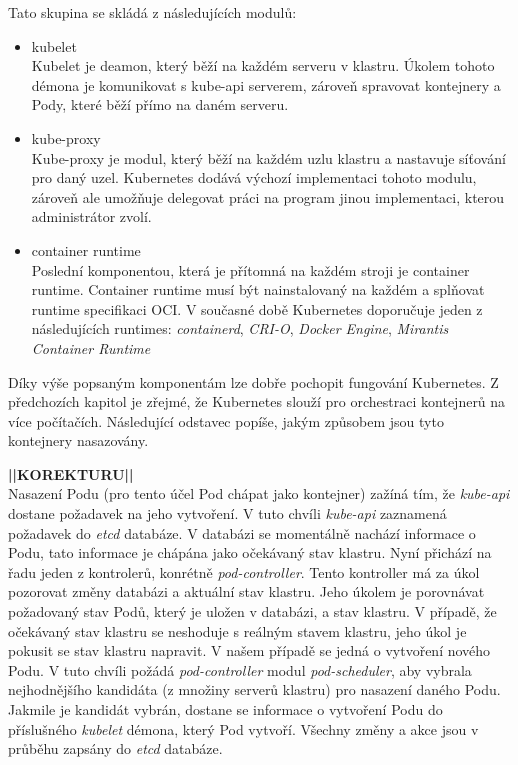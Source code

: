 Tato skupina se skládá z následujících modulů:
\begin{itemize}
    \item kubelet\\
    Kubelet je deamon, který běží na každém serveru v klastru. Úkolem tohoto démona je komunikovat s kube-api serverem, zároveň spravovat kontejnery a Pody, které běží přímo na daném serveru. 
    \item kube-proxy\\
    Kube-proxy je modul, který běží na každém uzlu klastru a nastavuje síťování pro daný uzel. Kubernetes dodává výchozí implementaci tohoto modulu, zároveň ale umožňuje delegovat práci na program jinou implementaci, kterou administrátor zvolí. 
    \item container runtime\\
    Poslední komponentou, která je přítomná na každém stroji je container runtime. Container runtime musí být nainstalovaný na každém a splňovat runtime specifikaci OCI. V současné době Kubernetes doporučuje jeden z následujících runtimes: \textit{containerd}, \textit{CRI-O}, \textit{Docker Engine}, \textit{Mirantis Container Runtime} \cite{thekubernetesauthors_2023_container} 
\end{itemize}

Díky výše popsaným komponentám lze dobře pochopit fungování Kubernetes. Z předchozích kapitol je zřejmé, že Kubernetes slouží pro orchestraci kontejnerů na více počítačích. Následující odstavec popíše, jakým způsobem jsou tyto kontejnery nasazovány.

\textbf{||KOREKTURU||}\\
Nasazení Podu (pro tento účel Pod chápat jako kontejner) zažíná tím, že \textit{kube-api} dostane požadavek na jeho vytvoření. V tuto chvíli \textit{kube-api} zaznamená požadavek do \textit{etcd} databáze. V databázi se momentálně nachází informace o Podu, tato informace je chápána jako očekávaný stav klastru. Nyní přichází na řadu jeden z kontrolerů, konrétně \textit{pod-controller}. Tento kontroller má za úkol pozorovat změny databázi a aktuální stav klastru. Jeho úkolem je porovnávat požadovaný stav Podů, který je uložen v databázi, a stav klastru. V případě, že očekávaný stav klastru se neshoduje s reálným stavem klastru, jeho úkol je pokusit se stav klastru napravit. V našem případě se jedná o vytvoření nového Podu. V tuto chvíli požádá \textit{pod-controller} modul \textit{pod-scheduler}, aby vybrala nejhodnějšího kandidáta (z množiny serverů klastru) pro nasazení daného Podu. Jakmile je kandidát vybrán, dostane se informace o vytvoření Podu do příslušného \textit{kubelet} démona, který Pod vytvoří. Všechny změny a akce jsou v průběhu zapsány do \textit{etcd} databáze.  

